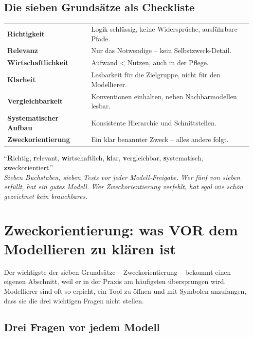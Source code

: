 \documentclass[11pt,a4paper,oneside]{article}
\newcommand{\caveatfontfallback}{\itshape}
\newcommand\caveatfont{\caveatfontfallback}%
\newcommand{\akzent}[1]{{\caveatfont\color{lpAmber}#1}}
\begin{document}
\subsection{Die sieben Grundsätze als Checkliste}

\begin{tabularx}{\linewidth}{@{}>{\bfseries}lX@{}}
\toprule
Richtigkeit & Logik schlüssig, keine Widersprüche, ausführbare Pfade. \\
Relevanz & Nur das Notwendige -- kein Selbstzweck-Detail. \\
Wirtschaftlichkeit & Aufwand \textless{} Nutzen, auch in der Pflege. \\
Klarheit & Lesbarkeit für die Zielgruppe, nicht für den Modellierer. \\
Vergleichbarkeit & Konventionen einhalten, neben Nachbarmodellen lesbar. \\
Systematischer Aufbau & Konsistente Hierarchie und Schnittstellen. \\
Zweckorientierung & Ein klar benannter Zweck -- alles andere folgt. \\
\bottomrule
\end{tabularx}

\begin{eselsbox}[Eselsbrücke: \akzent{R-R-W-K-V-S-Z}]
``\textbf{R}ichtig, \textbf{r}elevant, \textbf{w}irtschaftlich, \textbf{k}lar, \textbf{v}ergleichbar, \textbf{s}ystematisch, \textbf{z}weckorientiert.''\\[2pt]
\emph{Sieben Buchstaben, sieben Tests vor jeder Modell-Freigabe. Wer fünf von sieben erfüllt, hat ein gutes Modell. Wer Zweckorientierung verfehlt, hat \textemdash{} egal wie schön gezeichnet \textemdash{} kein brauchbares.}
\end{eselsbox}

\section{Zweckorientierung: was VOR dem Modellieren zu klären ist}

Der wichtigste der sieben Grundsätze -- Zweckorientierung -- bekommt einen eigenen Abschnitt, weil er in der Praxis am häufigsten übersprungen wird. Modellierer sind oft so erpicht, ein Tool zu öffnen und mit Symbolen anzufangen, dass sie die drei wichtigen Fragen nicht stellen.

\subsection{Drei Fragen vor jedem Modell}
\end{document}
